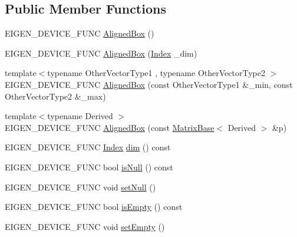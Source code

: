\subsection*{Public Member Functions}
\begin{DoxyCompactItemize}
\item 
E\+I\+G\+E\+N\+\_\+\+D\+E\+V\+I\+C\+E\+\_\+\+F\+U\+NC \mbox{\hyperlink{class_eigen_1_1_aligned_box_aeb7682d3d8676752e9b789b51d950872}{Aligned\+Box}} ()
\item 
E\+I\+G\+E\+N\+\_\+\+D\+E\+V\+I\+C\+E\+\_\+\+F\+U\+NC \mbox{\hyperlink{class_eigen_1_1_aligned_box_a23c536bbeb17416e4c39b1dd346408f6}{Aligned\+Box}} (\mbox{\hyperlink{class_eigen_1_1_aligned_box_a774ef355da13d6bee6a6e7244c15231a}{Index}} \+\_\+dim)
\item 
{\footnotesize template$<$typename Other\+Vector\+Type1 , typename Other\+Vector\+Type2 $>$ }\\E\+I\+G\+E\+N\+\_\+\+D\+E\+V\+I\+C\+E\+\_\+\+F\+U\+NC \mbox{\hyperlink{class_eigen_1_1_aligned_box_afbede45e6cc624de2033d219a158f248}{Aligned\+Box}} (const Other\+Vector\+Type1 \&\+\_\+min, const Other\+Vector\+Type2 \&\+\_\+max)
\item 
{\footnotesize template$<$typename Derived $>$ }\\E\+I\+G\+E\+N\+\_\+\+D\+E\+V\+I\+C\+E\+\_\+\+F\+U\+NC \mbox{\hyperlink{class_eigen_1_1_aligned_box_a2d851323bca421a59fb73b1258d130e7}{Aligned\+Box}} (const \mbox{\hyperlink{class_eigen_1_1_matrix_base}{Matrix\+Base}}$<$ Derived $>$ \&p)
\item 
E\+I\+G\+E\+N\+\_\+\+D\+E\+V\+I\+C\+E\+\_\+\+F\+U\+NC \mbox{\hyperlink{class_eigen_1_1_aligned_box_a774ef355da13d6bee6a6e7244c15231a}{Index}} \mbox{\hyperlink{class_eigen_1_1_aligned_box_ab774df3608d0be913a3aa5d67476a521}{dim}} () const
\item 
E\+I\+G\+E\+N\+\_\+\+D\+E\+V\+I\+C\+E\+\_\+\+F\+U\+NC bool \mbox{\hyperlink{class_eigen_1_1_aligned_box_a441638bbddbd4c8924cec736e7af7f96}{is\+Null}} () const
\item 
E\+I\+G\+E\+N\+\_\+\+D\+E\+V\+I\+C\+E\+\_\+\+F\+U\+NC void \mbox{\hyperlink{class_eigen_1_1_aligned_box_a1e0e312d7bd3468d7e15edb4f139fd13}{set\+Null}} ()
\item 
E\+I\+G\+E\+N\+\_\+\+D\+E\+V\+I\+C\+E\+\_\+\+F\+U\+NC bool \mbox{\hyperlink{class_eigen_1_1_aligned_box_a0d194e2e56c3bef854e88ca2aba04c9e}{is\+Empty}} () const
\item 
E\+I\+G\+E\+N\+\_\+\+D\+E\+V\+I\+C\+E\+\_\+\+F\+U\+NC void \mbox{\hyperlink{class_eigen_1_1_aligned_box_ae946a0964de83d4e688fa462fe6d6725}{set\+Empty}} ()

\end{DoxyCompactItemize}
